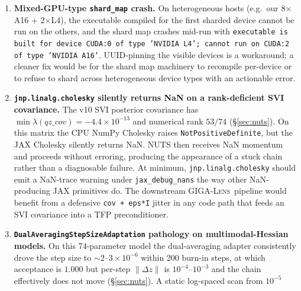 \documentclass[11pt,letterpaper]{article}
\newcommand{\gigalens}{\textsc{GIGA-Lens}}
\begin{document}
\begin{enumerate}
gigalens's \texttt{lstsq\_simulate} (\texttt{gigalens.jax.simulator})
solves the linear amplitudes via $\mathrm{pinv}(X^{\!\top}WX)$,
{\it omits}\ the $-\tfrac12\log\det(X^{\!\top}WX)$ Gaussian-evidence
normalization, and applies no prior regularization. On the
near-rank-deficient shapelet design matrix the \texttt{pinv}
singular-value truncation makes the profiled log-posterior non-smooth in
the nonlinear parameters, so \texttt{jax.grad} floors at
$\|\nabla\|\sim10^{5}$ and no PD mode is reachable (\S\ref{sec:hmc}).
Adding the $-\tfrac12\log\det$ term and a prior-derived Tikhonov ridge
$\Lambda$ (so the solve is a Cholesky on $X^{\!\top}WX+\Lambda$) restores
smoothness and is the fix we implement in \texttt{\_hmc\_lib\_marg.py}.
\item \textbf{Mixed-GPU-type \texttt{shard\_map} crash.} On heterogeneous
hosts (e.g.\ our 8$\times$A16 $+$ 2$\times$L4), the executable
compiled for the first sharded device cannot be run on the others, and
the shard map crashes mid-run with
\texttt{executable is built for device CUDA:0 of type 'NVIDIA L4'; cannot
run on CUDA:2 of type 'NVIDIA A16'}. UUID-pinning the visible devices
is a workaround; a cleaner fix would be for the shard map machinery
to recompile per-device or to refuse to shard across heterogeneous
device types with an actionable error.
\item \textbf{\texttt{jnp.linalg.cholesky} silently returns NaN on
a rank-deficient SVI covariance.} The v10 SVI posterior covariance
has $\min\lambda(qz\_cov)=-4.4\times10^{-13}$ and numerical rank
$53/74$ (\S\ref{sec:nuts}). On this matrix the CPU NumPy Cholesky
raises \texttt{NotPositiveDefinite}, but the JAX Cholesky silently
returns NaN. NUTS then receives NaN momentum and proceeds without
erroring, producing the appearance of a stuck chain rather than a
diagnosable failure. At minimum, \texttt{jnp.linalg.cholesky} should
emit a NaN-trace warning under \texttt{jax\_debug\_nans} the way other
NaN-producing JAX primitives do. The downstream \gigalens\ pipeline
would benefit from a defensive \texttt{cov + eps*I} jitter in any code
path that feeds an SVI covariance into a TFP preconditioner.
\item \textbf{\texttt{DualAveragingStepSizeAdaptation} pathology on
multimodal-Hessian models.} On this 74-parameter model the dual-averaging
adapter consistently drove the step size to $\sim$2--$3\times10^{-6}$
within 200 burn-in steps, at which acceptance is $1.000$ but per-step
$\|\Delta z\|$ is $10^{-4}$--$10^{-3}$ and the chain effectively does
not move (\S\ref{sec:nuts}). A static log-spaced scan from $10^{-5}$

\end{enumerate}
\end{document}

